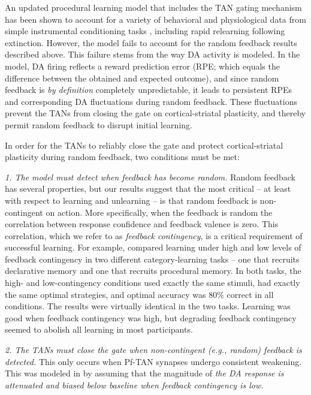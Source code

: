 An updated procedural learning model that includes the TAN gating mechanism has
been shown to account for a variety of behavioral and physiological data from
simple instrumental conditioning tasks
\cite{ashby_computational_2011, crossley_expanding_2016}, including rapid
relearning following extinction. However, the model fails to account for the
random feedback results described above. This failure stems from the way DA
activity is modeled. In the model, DA firing reflects a reward prediction error
(RPE; which equals the difference between the obtained and expected outcome), and since
random feedback is \emph{by definition} completely unpredictable, it leads to
persistent RPEs and corresponding DA fluctuations during random feedback. These
fluctuations prevent the TANs from closing the gate on cortical-striatal
plasticity, and thereby permit random feedback to disrupt initial learning.

In order for the TANs to reliably close the gate and protect cortical-striatal
plasticity during random feedback, two conditions must be met:

\begin{description}
\item \textit{1. The model must detect when feedback has become random.} Random
  feedback has several properties, but our results suggest that the most critical -- at least with respect to learning and unlearning -- is that random feedback is non-contingent on action. More specifically, when the feedback is random the correlation between response confidence and feedback valence is zero. This correlation, which we refer to as \textit{feedback contingency}, is a critical requirement of successful learning. For example,  compared learning under high and low levels of feedback contingency in two different category-learning tasks -- one that recruits declarative memory and one that recruits procedural memory. In both tasks, the high- and low-contingency conditions used exactly the same stimuli, had exactly the same optimal strategies, and optimal accuracy was 80\% correct in all conditions. The results were virtually identical in the two tasks. Learning was good when feedback contingency was high, but degrading feedback contingency seemed to abolish all learning in most participants.

\item \textit{2. The TANs must close the gate when non-contingent (e.g., random) feedback is detected.} This only occurs when Pf-TAN synapses undergo consistent weakening. This was modeled in \cite{crossley_erasing_2013} by assuming that the magnitude of \textit{the DA response is attenuated and biased below baseline when feedback contingency is low.}
\end{description}

